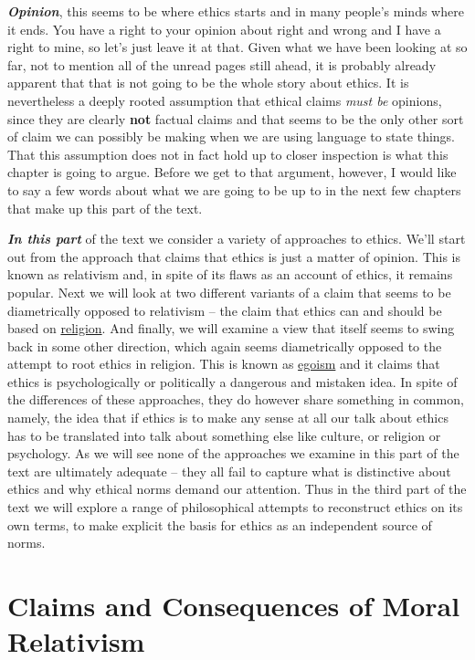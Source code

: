 \documentclass[12pt, openany]{book}
\begin{document}
\textbf{\emph{Opinion}}, this seems to be where ethics starts and in many people's minds where it ends. You have a right to your opinion about right and wrong and I have a right to mine, so let's just leave it at that. Given what we have been looking at so far, not to mention all of the unread pages still ahead, it is probably already apparent that that is not going to be the whole story about ethics. It is nevertheless a deeply rooted assumption that ethical claims \emph{must be} opinions, since they are clearly \textbf{not} factual claims and that seems to be the only other sort of claim we can possibly be making when we are using language to state things. That this assumption does not in fact hold up to closer inspection is what this chapter is going to argue. Before we get to that argument, however, I would like to say a few words about what we are going to be up to in the next few chapters that make up this part of the text.

\textbf{\emph{In this part}} of the text we consider a variety of approaches to ethics. We'll start out from the approach that claims that ethics is just a matter of opinion. This is known as relativism and, in spite of its flaws as an account of ethics, it remains popular. Next we will look at two different variants of a claim that seems to be diametrically opposed to relativism -- the claim that ethics can and should be based on \protect\hyperlink{religion}{religion}. And finally, we will examine a view that itself seems to swing back in some other direction, which again seems diametrically opposed to the attempt to root ethics in religion. This is known as \protect\hyperlink{egoism}{egoism} and it claims that ethics is psychologically or politically a dangerous and mistaken idea. In spite of the differences of these approaches, they do however share something in common, namely, the idea that if ethics is to make any sense at all our talk about ethics has to be translated into talk about something else like culture, or religion or psychology. As we will see none of the approaches we examine in this part of the text are ultimately adequate -- they all fail to capture what is distinctive about ethics and why ethical norms demand our attention. Thus in the third part of the text we will explore a range of philosophical attempts to reconstruct ethics on its own terms, to make explicit the basis for ethics as an independent source of norms.

\hypertarget{claims-and-consequences-of-moral-relativism}{%
\section{Claims and Consequences of Moral Relativism}\label{claims-and-consequences-of-moral-relativism}}
\end{document}
